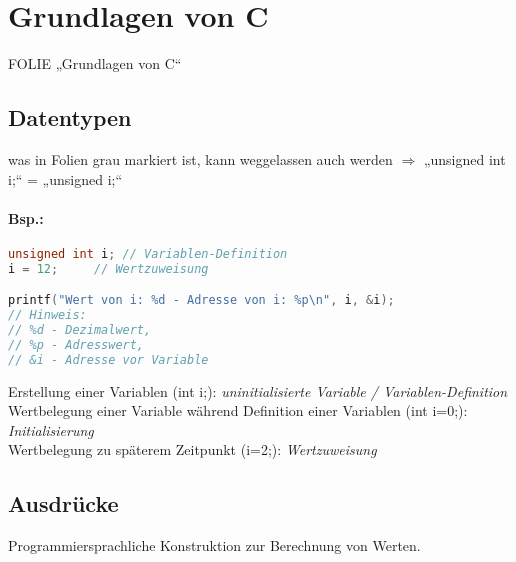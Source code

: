 \section{Grundlagen von C}

FOLIE „Grundlagen von C“

\subsection{Datentypen}
was in Folien grau markiert ist, kann weggelassen auch werden $\Rightarrow$ „unsigned int i;“ = „unsigned i;“

\paragraph{Bsp.:}

\begin{lstlisting}[language=C]
unsigned int i;	// Variablen-Definition
i = 12;		// Wertzuweisung

printf("Wert von i: %d - Adresse von i: %p\n", i, &i);
// Hinweis: 
// %d - Dezimalwert, 
// %p - Adresswert, 
// &i - Adresse vor Variable
\end{lstlisting}
Erstellung einer Variablen (int i;): \emph{uninitialisierte Variable / Variablen-Definition}\\
Wertbelegung einer Variable während Definition einer Variablen (int i=0;): \emph{Initialisierung}\\
Wertbelegung zu späterem Zeitpunkt (i=2;): \emph{Wertzuweisung}

\subsection{Ausdrücke}
Programmiersprachliche Konstruktion zur Berechnung von Werten.
